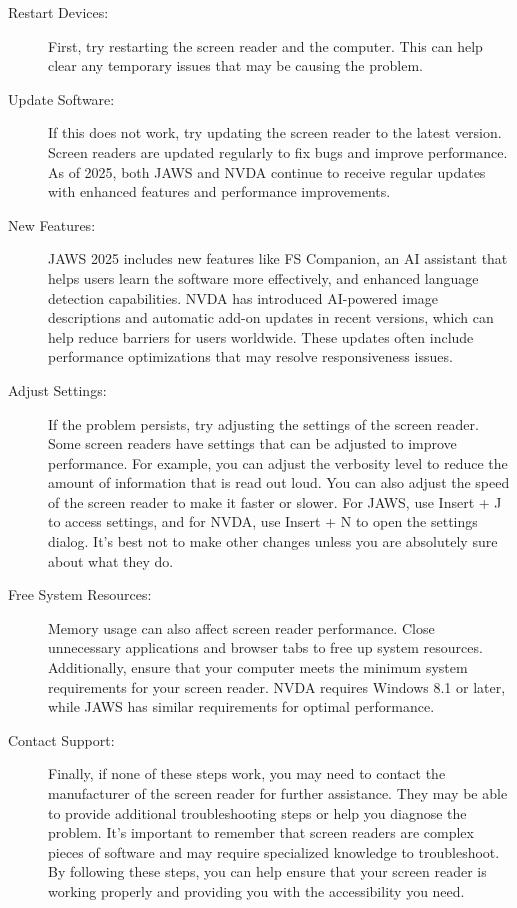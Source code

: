 \begin{description}
    \item[Restart Devices:] First, try restarting the screen reader and the computer. This can help clear any temporary issues that may be causing the problem.
    \item[Update Software:] If this does not work, try updating the screen reader to the latest version. Screen readers are updated regularly to fix bugs and improve performance. As of 2025, both JAWS and NVDA continue to receive regular updates with enhanced features and performance improvements.
    \item[New Features:] JAWS 2025 includes new features like FS Companion, an AI assistant that helps users learn the software more effectively, and enhanced language detection capabilities. NVDA has introduced AI-powered image descriptions and automatic add-on updates in recent versions, which can help reduce barriers for users worldwide. These updates often include performance optimizations that may resolve responsiveness issues.
    \item[Adjust Settings:] If the problem persists, try adjusting the settings of the screen reader. Some screen readers have settings that can be adjusted to improve performance. For example, you can adjust the verbosity level to reduce the amount of information that is read out loud. You can also adjust the speed of the screen reader to make it faster or slower. For JAWS, use Insert + J to access settings, and for NVDA, use Insert + N to open the settings dialog. It's best not to make other changes unless you are absolutely sure about what they do.
    \item[Free System Resources:] Memory usage can also affect screen reader performance. Close unnecessary applications and browser tabs to free up system resources. Additionally, ensure that your computer meets the minimum system requirements for your screen reader. NVDA requires Windows 8.1 or later, while JAWS has similar requirements for optimal performance.
    \item[Contact Support:] Finally, if none of these steps work, you may need to contact the manufacturer of the screen reader for further assistance. They may be able to provide additional troubleshooting steps or help you diagnose the problem. It's important to remember that screen readers are complex pieces of software and may require specialized knowledge to troubleshoot. By following these steps, you can help ensure that your screen reader is working properly and providing you with the accessibility you need.
\end{description}

